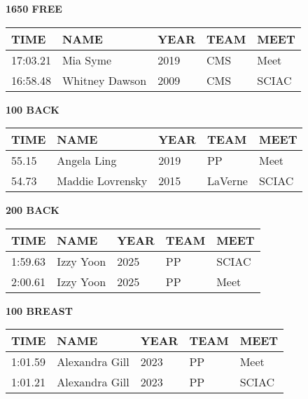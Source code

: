 \begin{table}[H]
\centering
\begin{minipage}[t]{0.48\textwidth}
\centering
\textbf{1650 FREE}\\[0.1cm]
\begin{tabular}{@{}p{1.8cm}p{2.8cm}p{1.2cm}p{1.4cm}p{1.4cm}@{}}
\hline
    \textbf{TIME} & \textbf{NAME} & \textbf{YEAR} & \textbf{TEAM} & \textbf{MEET} \\
\hline
    17:03.21 & Mia Syme & 2019 & CMS & Meet \\
    16:58.48 & Whitney Dawson & 2009 & CMS & SCIAC \\
\hline
\end{tabular}
\end{minipage}\hfill
\begin{minipage}[t]{0.48\textwidth}
\centering
\textbf{100 BACK}\\[0.1cm]
\begin{tabular}{@{}p{1.8cm}p{2.8cm}p{1.2cm}p{1.4cm}p{1.4cm}@{}}
\hline
    \textbf{TIME} & \textbf{NAME} & \textbf{YEAR} & \textbf{TEAM} & \textbf{MEET} \\
\hline
    55.15 & Angela Ling & 2019 & PP & Meet \\
    54.73 & Maddie Lovrensky & 2015 & LaVerne & SCIAC \\
\hline
\end{tabular}
\end{minipage}
\end{table}

\begin{table}[H]
\centering
\begin{minipage}[t]{0.48\textwidth}
\centering
\textbf{200 BACK}\\[0.1cm]
\begin{tabular}{@{}p{1.8cm}p{2.8cm}p{1.2cm}p{1.4cm}p{1.4cm}@{}}
\hline
    \textbf{TIME} & \textbf{NAME} & \textbf{YEAR} & \textbf{TEAM} & \textbf{MEET} \\
\hline
    1:59.63 & Izzy Yoon & 2025 & PP & SCIAC \\
    2:00.61 & Izzy Yoon & 2025 & PP & Meet \\
\hline
\end{tabular}
\end{minipage}\hfill
\begin{minipage}[t]{0.48\textwidth}
\centering
\textbf{100 BREAST}\\[0.1cm]
\begin{tabular}{@{}p{1.8cm}p{2.8cm}p{1.2cm}p{1.4cm}p{1.4cm}@{}}
\hline
    \textbf{TIME} & \textbf{NAME} & \textbf{YEAR} & \textbf{TEAM} & \textbf{MEET} \\
\hline
    1:01.59 & Alexandra Gill & 2023 & PP & Meet \\
    1:01.21 & Alexandra Gill & 2023 & PP & SCIAC \\
\hline
\end{tabular}
\end{minipage}
\end{table}

